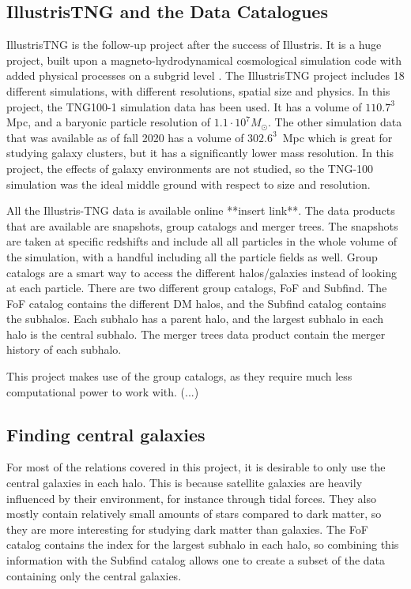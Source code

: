 \subsection{IllustrisTNG and the Data Catalogues}

IllustrisTNG is the follow-up project after the success of Illustris. It is a huge project, built upon a magneto-hydrodynamical cosmological simulation code with added physical processes on a subgrid level \parencite{Weinberger2016}. The IllustrisTNG project includes 18 different simulations, with different resolutions, spatial size and physics. In this project, the TNG100-1 simulation data has been used. It has a volume of $110.7^3 \,$ Mpc, and a baryonic particle resolution of $1.1 \cdot 10^7 M_{\odot}$. The other simulation data that was available as of fall 2020 has a volume of $302.6^3 \,$ Mpc which is great for studying galaxy clusters, but it has a significantly lower mass resolution. In this project, the effects of galaxy environments are not studied, so the TNG-100 simulation was the ideal middle ground with respect to size and resolution.

All the Illustris-TNG data is available online **insert link**. The data products that are available are snapshots, group catalogs and merger trees. The snapshots are taken at specific redshifts and include all all particles in the whole volume of the simulation, with a handful including all the particle fields as well. Group catalogs are a smart way to access the different halos/galaxies instead of looking at each particle. There are two different group catalogs, FoF and Subfind. The FoF catalog contains the different DM halos, and the Subfind catalog contains the subhalos. Each subhalo has a parent halo, and the largest subhalo in each halo is the central subhalo. The merger trees data product contain the merger history of each subhalo.

This project makes use of the group catalogs, as they require much less computational power to work with. (...)


\subsection{Finding central galaxies}
For most of the relations covered in this project, it is desirable to only use the central galaxies in each halo. This is because satellite galaxies are heavily influenced by their environment, for instance through tidal forces. They also mostly contain relatively small amounts of stars compared to dark matter, so they are more interesting for studying dark matter than galaxies. The FoF catalog contains the index for the largest subhalo in each halo, so combining this information with the Subfind catalog allows one to create a subset of the data containing only the central galaxies.

